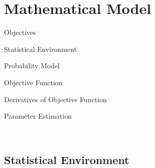 \chapter{Mathematical Model}

\begin{shadowbox}{\begin{smlpage}{Objectives}
\begin{large}
\begin{smlitemize}
\begin{item}
Statistical Environment
\end{item}
\begin{item}
Probability Model
\end{item}
\begin{item}
Objective Function
\end{item}
\begin{item}
Derivatives of Objective Function
\end{item}
\begin{item}
Parameter Estimation
\end{item}
\end{smlitemize}
\end{large}
\end{smlpage}}\end{shadowbox} \\

\section{Statistical Environment}


